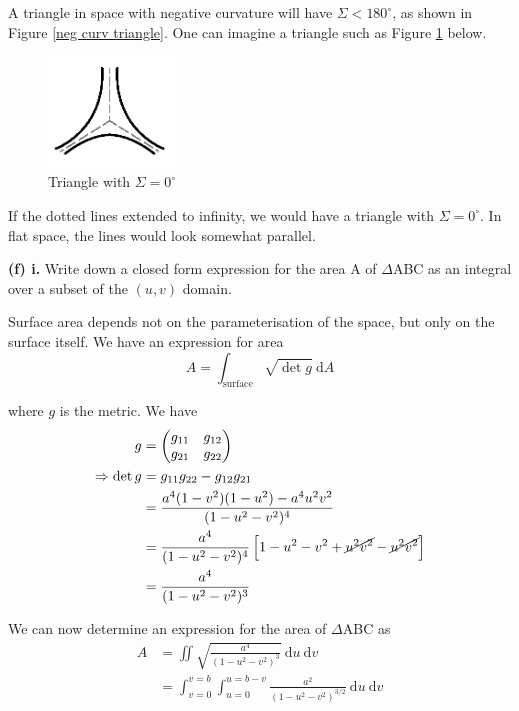 \documentclass[a4paper]{article} %
\newcommand{\pmx}[1]{\begin{pmatrix}#1\end{pmatrix}}
\begin{document}
A triangle in space with negative curvature will have $\Sigma<180^{\circ}$, as shown in Figure \ref{neg curv triangle}. One can imagine a triangle such as Figure \ref{no angle triangle} below.

\begin{figure}[h]
\centering
\includegraphics[width=0.3\textwidth]{images/zeroAngle.png}
\caption{Triangle with $\Sigma=0^{\circ}$}
\label{no angle triangle}
\end{figure}

If the dotted lines extended to infinity, we would have a triangle with $\Sigma=0^{\circ}$. In flat space, the lines would look somewhat parallel.

\pagebreak  %

\begin{framed}
\textbf{(f) i.} Write down a closed form expression for the area A of $\Delta$ABC as an integral over a subset of the $(u,v)$ domain.
\end{framed}

Surface area depends not on the parameterisation of the space, but only on the surface itself. We have an expression for area
\begin{equation}
A=\int_{\text{surface}}\sqrt{\det g}~\text{d}A
\end{equation}

where $g$ is the metric. We have
\begin{align}
g&=\pmx{g_{11}&g_{12}\\g_{21}&g_{22}}\\
\Rightarrow \det g&=g_{11}g_{22}-g_{12}g_{21}\\
&=\frac{a^4(1-v^2)(1-u^2)-a^4 u^2 v^2}{(1-u^2-v^2)^4}\\
&=\frac{a^4}{(1-u^2-v^2)^4}\left[1-u^2-v^2+\cancel{u^2 v^2}-\cancel{u^2 v^2}\right]\\
&=\frac{a^4}{(1-u^2-v^2)^3}
\end{align}

We can now determine an expression for the area of $\Delta$ABC as
\begin{align}
A&=\iint \sqrt{\frac{a^4}{(1-u^2-v^2)^3}}~\text{d}u~\text{d}v\\
&=\int_{v=0}^{v=b}\int_{u=0}^{u=b-v}\frac{a^2}{(1-u^2-v^2)^{3/2}}~\text{d}u~\text{d}v\label{abc area uv}
\end{align}
\end{document}
